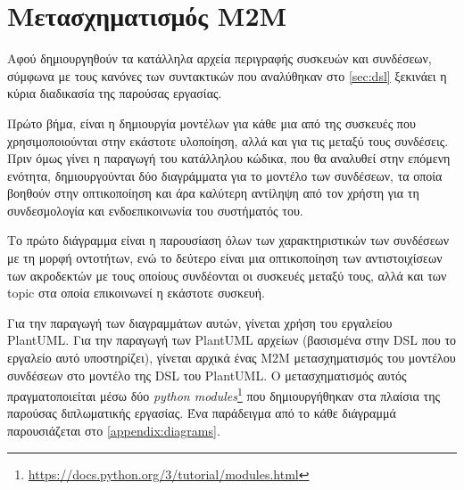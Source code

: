 \section{Μετασχηματισμός M2M}
\label{sec:transformation}

Αφού δημιουργηθούν τα κατάλληλα αρχεία περιγραφής συσκευών και συνδέσεων, σύμφωνα με τους κανόνες των συντακτικών που αναλύθηκαν στο \autoref{sec:dsl} ξεκινάει η κύρια διαδικασία της παρούσας εργασίας.

Πρώτο βήμα, είναι η δημιουργία μοντέλων για κάθε μια από της συσκευές που χρησιμοποιούνται στην εκάστοτε υλοποίηση, αλλά και για τις μεταξύ τους συνδέσεις. Πριν όμως γίνει η παραγωγή του κατάλληλου κώδικα, που θα αναλυθεί στην επόμενη ενότητα, δημιουργούνται δύο διαγράμματα για το μοντέλο των συνδέσεων, τα οποία βοηθούν στην οπτικοποίηση και άρα καλύτερη αντίληψη από τον χρήστη για τη συνδεσμολογία και ενδοεπικοινωνία του συστήματός του.

Το πρώτο διάγραμμα είναι η παρουσίαση όλων των χαρακτηριστικών των συνδέσεων με τη μορφή οντοτήτων, ενώ το δεύτερο είναι μια οπτικοποίηση των αντιστοιχίσεων των ακροδεκτών με τους οποίους συνδέονται οι συσκευές μεταξύ τους, αλλά και των topic στα οποία επικοινωνεί η εκάστοτε συσκευή.

Για την παραγωγή των διαγραμμάτων αυτών, γίνεται χρήση του εργαλείου PlantUML. Για την παραγωγή των PlantUML αρχείων (βασισμένα στην DSL που το εργαλείο αυτό υποστηρίζει), γίνεται αρχικά ένας M2M μετασχηματισμός του μοντέλου συνδέσεων στο μοντέλο της DSL του PlantUML. Ο μετασχηματισμός αυτός πραγματοποιείται μέσω δύο \textit{python modules}\footnote{\url{https://docs.python.org/3/tutorial/modules.html}} που δημιουργήθηκαν στα πλαίσια της παρούσας διπλωματικής εργασίας. Ένα παράδειγμα από το κάθε διάγραμμά παρουσιάζεται στο \autoref{appendix:diagrams}.